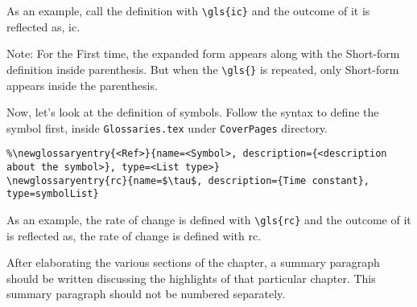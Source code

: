 As an example, call the definition with \verb|\gls{ic}| and the outcome of it is reflected as, \gls{ic}.

Note: For the First time, the expanded form appears along with the Short-form definition inside parenthesis. But when the \verb|\gls{}| is repeated, only Short-form appears inside the parenthesis.

Now, let's look at the definition of symbols. Follow the syntax to define the symbol first, inside \texttt{Glossaries.tex} under \texttt{CoverPages} directory.
\begin{verbatim}
%\newglossaryentry{<Ref>}{name=<Symbol>, description={<description about the symbol>}, type=<List type>}
\newglossaryentry{rc}{name=$\tau$, description={Time constant}, type=symbolList}
\end{verbatim}

As an example, the rate of change is defined with \verb|\gls{rc}| and the outcome of it is reflected as, the rate of change is defined with \gls{rc}.

\vspace{0.75cm}

After elaborating the various sections of the chapter, a summary paragraph should be written discussing the highlights of that particular chapter. This summary paragraph should not be numbered separately.  
